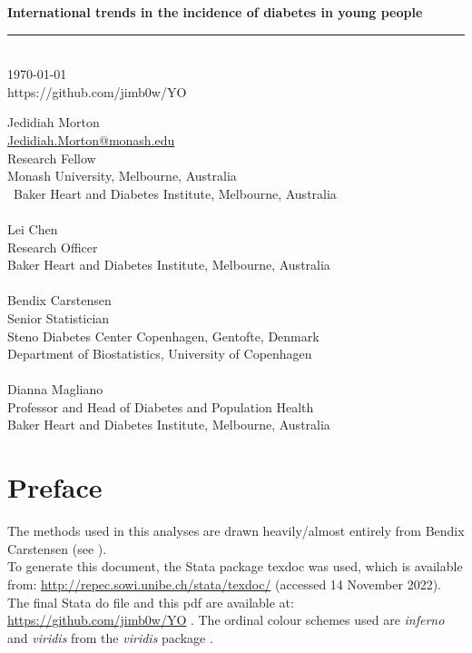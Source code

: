 \documentclass[11pt]{article}
\newcommand{\thedate}{\today}
\begin{document}
\begin{titlepage}
    \begin{flushright}
        \Huge
        \textbf{International trends in the incidence of diabetes in young people}
\color{black}
\rule{16cm}{2mm} \\
\Large
\color{black}
\thedate \\
\color{blue}
https://github.com/jimb0w/YO \\
\color{black}
       \vfill
    \end{flushright}
        \Large

\noindent
Jedidiah Morton \\
\color{blue}
\href{mailto:Jedidiah.Morton@Monash.edu}{Jedidiah.Morton@monash.edu} \\ 
\color{black}
Research Fellow \\
\color{blue}
\color{black}
Monash University, Melbourne, Australia \\\
Baker Heart and Diabetes Institute, Melbourne, Australia \\
\\
\noindent
Lei Chen \\
Research Officer \\
Baker Heart and Diabetes Institute, Melbourne, Australia \\
\\
\noindent
Bendix Carstensen \\
Senior Statistician \\
Steno Diabetes Center Copenhagen, Gentofte, Denmark \\
Department of Biostatistics, University of Copenhagen \\
\\
\noindent
Dianna Magliano \\
Professor and Head of Diabetes and Population Health \\
Baker Heart and Diabetes Institute, Melbourne, Australia \\

\end{titlepage}

\pagebreak
\tableofcontents


\pagebreak
\section{Preface}

The methods used in this analyses are drawn heavily/almost entirely from Bendix Carstensen 
(see \cite{MaglianoLDE2021,CarstensenSTATMED2007}). \\
To generate this document, the Stata package texdoc \cite{Jann2016Stata} was used, which is 
available from: \color{blue} \url{http://repec.sowi.unibe.ch/stata/texdoc/} \color{black} (accessed 14 November 2022). The 
final Stata do file and this pdf are available at: \color{blue} \url{https://github.com/jimb0w/YO} \color{black}.
The ordinal colour schemes used are \emph{inferno} and \emph{viridis} from the
\emph{viridis} package \cite{GarnierR2021}.
\end{document}
